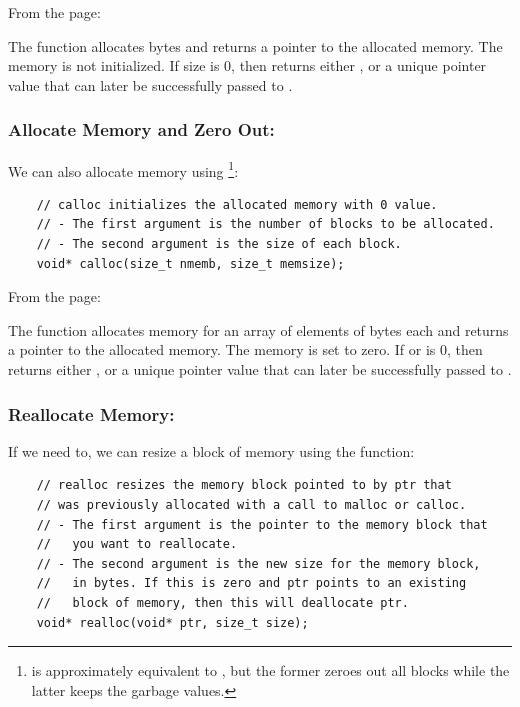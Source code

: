 \documentclass[letterpaper]{article}
\begin{document}
\bigskip 

From the  page:
\begin{displayquote}
    The  function allocates \underline{} bytes and returns a pointer to the allocated memory. The memory is not initialized.  If size is 0, then  returns either , or a unique pointer value that can later be successfully passed to .
\end{displayquote}

\subsubsection{Allocate Memory and Zero Out: }
We can also allocate memory using \footnote{ is approximately equivalent to , but the former zeroes out all blocks while the latter keeps the garbage values.}:
\begin{verbatim}
    // calloc initializes the allocated memory with 0 value.
    // - The first argument is the number of blocks to be allocated.
    // - The second argument is the size of each block.   
    void* calloc(size_t nmemb, size_t memsize);
\end{verbatim}

From the  page:
\begin{displayquote}
    The  function allocates memory for an array of \underline{} elements of \underline{} bytes each and returns a pointer to the allocated memory. The memory is set to zero. If \underline{} or \underline{} is 0, then  returns either , or a unique pointer value that can later be successfully passed to .
\end{displayquote}

\subsubsection{Reallocate Memory: }
If we need to, we can resize a block of memory using the  function:
\begin{verbatim}
    // realloc resizes the memory block pointed to by ptr that 
    // was previously allocated with a call to malloc or calloc. 
    // - The first argument is the pointer to the memory block that 
    //   you want to reallocate. 
    // - The second argument is the new size for the memory block, 
    //   in bytes. If this is zero and ptr points to an existing 
    //   block of memory, then this will deallocate ptr.  
    void* realloc(void* ptr, size_t size);  
\end{verbatim}
\end{document}
